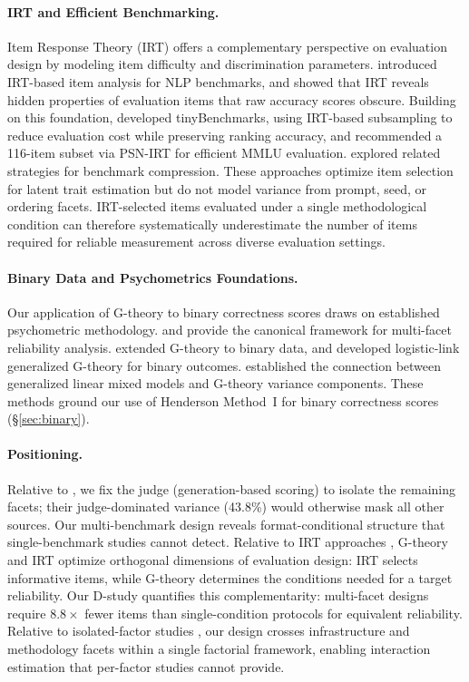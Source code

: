 \paragraph{IRT and Efficient Benchmarking.}
Item Response Theory (IRT) offers a complementary perspective on evaluation design by modeling item difficulty and discrimination parameters. \citet{lalor2019irt} introduced IRT-based item analysis for NLP benchmarks, and \citet{rodriguez2021leaderboards} showed that IRT reveals hidden properties of evaluation items that raw accuracy scores obscure. Building on this foundation, \citet{polo2024tinybenchmarks} developed tinyBenchmarks, using IRT-based subsampling to reduce evaluation cost while preserving ranking accuracy, and \citet{zhou2026irt} recommended a 116-item subset via PSN-IRT for efficient MMLU evaluation. \citet{perlitz2023efficient} explored related strategies for benchmark compression. These approaches optimize item selection for latent trait estimation but do not model variance from prompt, seed, or ordering facets. IRT-selected items evaluated under a single methodological condition can therefore systematically underestimate the number of items required for reliable measurement across diverse evaluation settings.

\paragraph{Binary Data and Psychometrics Foundations.}
Our application of G-theory to binary correctness scores draws on established psychometric methodology. \citet{shavelson1991generalizability} and \citet{brennan2001generalizability} provide the canonical framework for multi-facet reliability analysis. \citet{mushquash2006gtheory} extended G-theory to binary data, and \citet{jiang2018bayesian} developed logistic-link generalized G-theory for binary outcomes. \citet{tuerlinckx2006glmm} established the connection between generalized linear mixed models and G-theory variance components. These methods ground our use of Henderson Method~I for binary correctness scores (\S\ref{sec:binary}).

\paragraph{Positioning.}
Relative to \citet{mesting2026hidden}, we fix the judge (generation-based scoring) to isolate the remaining facets; their judge-dominated variance (43.8\%) would otherwise mask all other sources. Our multi-benchmark design reveals format-conditional structure that single-benchmark studies cannot detect. Relative to IRT approaches \citep{polo2024tinybenchmarks, zhou2026irt}, G-theory and IRT optimize orthogonal dimensions of evaluation design: IRT selects informative items, while G-theory determines the conditions needed for a target reliability. Our D-study quantifies this complementarity: multi-facet designs require $8.8\times$ fewer items than single-condition protocols for equivalent reliability. Relative to isolated-factor studies \citep{yuan2025layercast, sclar2024formatting, brittlebench2026}, our design crosses infrastructure and methodology facets within a single factorial framework, enabling interaction estimation that per-factor studies cannot provide.
